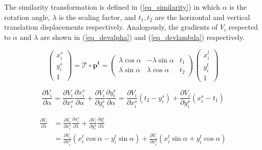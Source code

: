 \documentclass[10pt,twocolumn,letterpaper]{article}
\begin{document}
	The similarity transformation is defined in (\ref{eq_similarity}) in which $\alpha$ is the rotation angle, $\lambda$ is the scaling factor, and $t_1,t_2$ are the horizontal and vertical translation displacements respectively. Analogously, the gradients of $V_i$ respected to $\alpha$ and $\lambda$ are shown in (\ref{eq_devalpha}) and (\ref{eq_devlambda}) respectively.
	
	\begin{equation}\label{eq_similarity}
	\left(\begin{matrix}
	x^s_i\\y^s_i\\1
	\end{matrix} \right) = 
	\mathcal{T}\circ \mathbf{p^t} = 
	\left( \begin{matrix}
	\lambda \cos\alpha & -\lambda \sin\alpha & t_1\\
	\lambda \sin\alpha & \lambda \cos\alpha & t_2
	\end{matrix} \right)
	\left(\begin{matrix}
	x^t_i\\y^t_i\\1
	\end{matrix} \right)
	\end{equation}

	\begin{equation}\label{eq_devalpha}
	\frac{\partial V_i}{\partial \alpha} = \frac{\partial V_i}{\partial x_i^s} \frac{\partial x_i^s}{\partial \alpha} + \frac{\partial V_i}{\partial y_i^s} \frac{\partial y_i^s}{\partial \alpha}
	= \frac{\partial V_i}{\partial x_i^s} (t_2-y_i^s) + \frac{\partial V_i}{\partial y_i^s} (x_i^s-t_1)
	\end{equation}
	
	\begin{equation}\label{eq_devlambda}
	\begin{split}
	\frac{\partial V_i}{\partial \lambda} &= \frac{\partial V_i}{\partial x_i^s} \frac{\partial x_i^s}{\partial \lambda} + \frac{\partial V_i}{\partial y_i^s} \frac{\partial y_i^s}{\partial \lambda} \\
	&= \frac{\partial V_i}{\partial x_i^s} (x_i^t \cos\alpha - y_i^t \sin\alpha) + \frac{\partial V_i}{\partial x_i^s} (x_i^t \sin\alpha + y_i^t \cos\alpha)
	\end{split}
	\end{equation}

	
\end{document}
